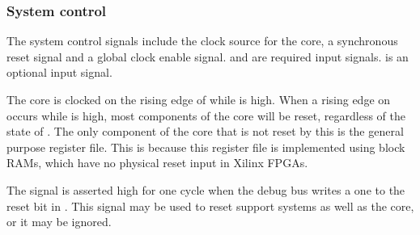 
\subsubsection{System control}
\label{sec:core-ug-cfg-inst-port-syscon}

The system control signals include the clock source for the core, a synchronous 
reset signal and a global clock enable signal.  and  are 
required  input signals.  is an optional 
 input signal.

The core is clocked on the rising edge of  while  is high. 
When a rising edge on  occurs while  is high, most
components of the core will be reset, regardless of the state of .
The only component of the core that is not reset by this is the general purpose
register file. This is because this register file is implemented using block
RAMs, which have no physical reset input in Xilinx FPGAs.

The  signal is asserted high for one cycle when the debug bus 
writes a one to the reset bit in . This signal may be used to reset 
support systems as well as the core, or it may be ignored.

